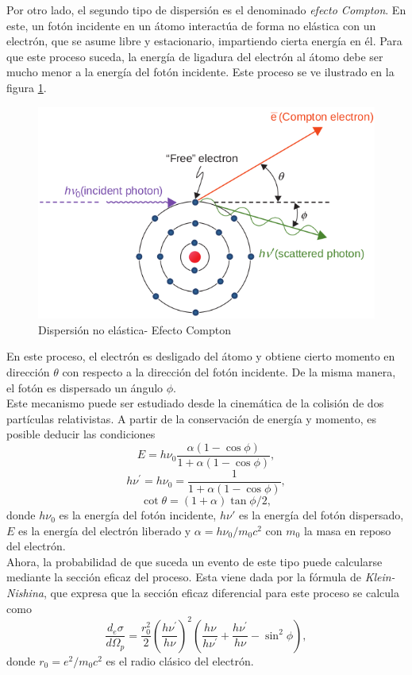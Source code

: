 Por otro lado, el segundo tipo de dispersión es el denominado \textit{efecto Compton}. En este, un fotón incidente en un átomo interactúa de forma no elástica con un electrón, que se asume libre y estacionario, impartiendo cierta energía en él. Para que este proceso suceda, la energía de ligadura del electrón al átomo debe ser mucho menor a la energía del fotón incidente. Este proceso se ve ilustrado en la figura \ref{fig:compton}.\\
\begin{figure}[H]
	\centering
	\includegraphics[width=0.7\linewidth]{images/compton.png}
	\caption{Dispersión no elástica- Efecto Compton \cite{khan2014the}}
	\label{fig:compton}
\end{figure}
En este proceso, el electrón es desligado del átomo y obtiene cierto momento en dirección $\theta$ con respecto a la dirección del fotón incidente. De la misma manera, el fotón es dispersado un ángulo $\phi$. \\

Este mecanismo puede ser estudiado desde la cinemática de la colisión de dos partículas relativistas. A partir de la conservación de energía y momento, es posible deducir las condiciones 
\begin{equation}
E=h \nu_{0} \frac{\alpha(1-\cos \phi)}{1+\alpha(1-\cos \phi)},
\end{equation}
\begin{equation}
h \nu^{\prime}=h \nu_{0}=\frac{1}{1+\alpha(1-\cos \phi)},
\end{equation}
\begin{equation}
\cot \theta=(1+\alpha) \tan \phi / 2,
\end{equation}
donde $h\nu_0$ es la energía del fotón incidente, $h\nu'$ es la energía del fotón dispersado, $E$ es la energía del electrón liberado y $\alpha=h\nu_0/m_0c^2$ con $m_0$ la masa en reposo del electrón. \\

Ahora, la probabilidad de que suceda un evento de este tipo puede calcularse mediante la sección eficaz del proceso. Esta viene dada por la fórmula de \textit{Klein-Nishina}, que expresa que la sección eficaz diferencial para este proceso se calcula como
\begin{equation}
\label{eqn:KleinNishina}
\frac{d_{e} \sigma}{d \Omega_{p}}=\frac{r_{0}^{2}}{2}\left(\frac{h \nu^{\prime}}{h \nu}\right)^{2}\left(\frac{h \nu}{h \nu^{\prime}}+\frac{h \nu^{\prime}}{h \nu}-\sin ^{2} \phi\right),
\end{equation}
donde $r_0=e^2/m_0c^2$ es el radio clásico del electrón.\\


